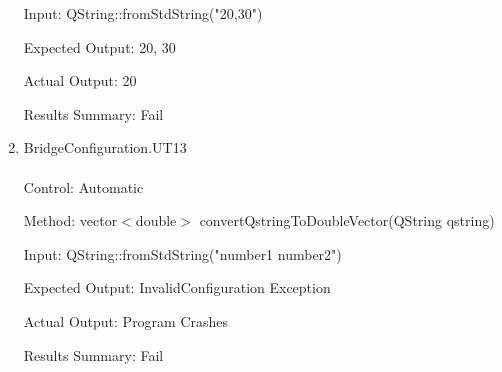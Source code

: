 \documentclass[12pt, titlepage]{article}
\begin{document}
\begin{enumerate}
    Input: QString::fromStdString("20,30")
    
    Expected Output: {20, 30}

    Actual Output: {20}

    Results Summary: Fail

    \item {BridgeConfiguration.UT13\\\\}
    Control: Automatic
    
    Method:  vector$<$double$>$ convertQstringToDoubleVector(QString qstring)
    
    Input: QString::fromStdString("number1 number2")
    
    Expected Output: InvalidConfiguration Exception

    Actual Output: Program Crashes

    Results Summary: Fail
\end{enumerate}
\end{document}
